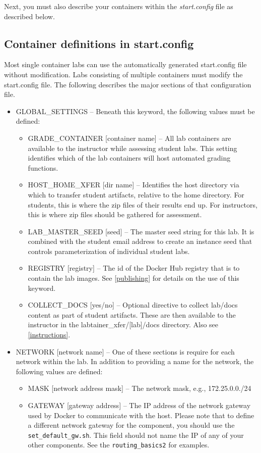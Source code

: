 \documentclass[12pt]{article}
\begin{document}
Next, you must also describe your containers within the \textit{start.config} file as described below.

\subsection{Container definitions in start.config}
\label{start.config}
Most single container labs can use the automatically generated start.config file
without modification.  Labs consisting of multiple containers must modify the start.config 
file.  The following describes the major sections of that configuration file.
\begin{itemize}
\item GLOBAL\_SETTINGS -- Beneath this keyword, the following values must be defined:

\begin{itemize}
\item GRADE\_CONTAINER [container name] -- All lab containers are available to the instructor while assessing student labs.
This setting identifies which of the lab containers will host automated grading functions.
\item HOST\_HOME\_XFER [dir name] --  Identifies the host directory via which to transfer student artifacts, relative to 
the home directory.  For students, this is where the zip files of their results end up.  For instructors, this is
where zip files should be gathered for assessment.
\item LAB\_MASTER\_SEED [seed] -- The master seed string for this lab.  It is combined with the student email
address to create an instance seed that controls parameterization of individual student labs.
\item REGISTRY [registry] -- The id of the Docker Hub registry that is to contain the lab images.
See \ref{publishing} for details on the use of this keyword.
\item COLLECT\_DOCS [yes/no] -- Optional directive to collect lab/docs content as part of student artifacts.
These are then available to the instructor in the labtainer\_xfer/[lab]/docs directory.  Also see \ref{instructions}.
\end{itemize}

\item NETWORK [network name] -- One of these sections is require for each network within the lab.  In addition to
providing a name for the network, the following values are defined:

\begin{itemize}
\item MASK [network address mask] -- The network mask, e.g., 172.25.0.0./24
\item GATEWAY [gateway address] -- The IP address of the network gateway used by Docker to communicate with the
host.  Please note that to define a different network gateway for the component, you should use the {\tt set\_default\_gw.sh}.  This field should not name the IP of any of your other components.  See the {\tt routing\_basics2} for examples.
\end{itemize}


\end{itemize}
\end{document}
